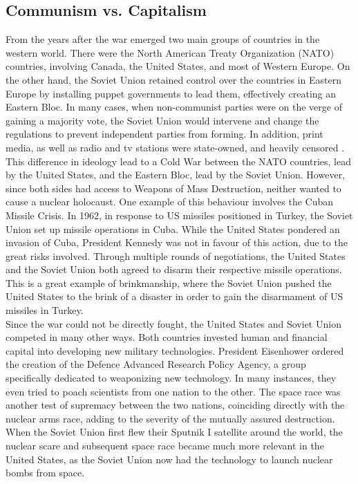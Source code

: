 \documentclass[12pt]{article}
\begin{document}
\subsection{Communism vs. Capitalism}

From the years after the war emerged two main groups of countries in the western world. There were the North American Treaty Organization (NATO) countries, involving Canada, the United States, and most of Western Europe\cite{13}. On the other hand, the Soviet Union retained control over the countries in Eastern Europe by installing puppet governments to lead them, effectively creating an Eastern Bloc\cite{13}. In many cases, when non-communist parties were on the verge of gaining a majority vote, the Soviet Union would intervene and change the regulations to prevent independent parties from forming. In addition, print media, as well as radio and tv stations were state-owned, and heavily censored \cite{14}.\\

This difference in ideology lead to a Cold War between the NATO countries, lead by the United States, and the Eastern Bloc, lead by the Soviet Union. However, since both sides had access to Weapons of Mass Destruction, neither wanted to cause a nuclear holocaust. One example of this behaviour involves the Cuban Missile Crisis. In 1962, in response to US missiles positioned in Turkey, the Soviet Union set up missile operations in Cuba\cite{15}. While the United States pondered an invasion of Cuba, President Kennedy was not in favour of this action, due to the great risks involved. Through multiple rounds of negotiations, the United States and the Soviet Union both agreed to disarm their respective missile operations\cite{15}. This is a great example of brinkmanship, where the Soviet Union pushed the United States to the brink of a disaster in order to gain the disarmament of US missiles in Turkey\cite{15}.\\

Since the war could not be directly fought, the United States and Soviet Union competed in many other ways. Both countries invested human and financial capital into developing new military technologies. President Eisenhower ordered the creation of the Defence Advanced Research Policy Agency, a group specifically dedicated to weaponizing new technology\cite{16}. In many instances, they even tried to poach scientists from one nation to the other. The space race was another test of supremacy between the two nations, coinciding directly with the nuclear arms race, adding to the severity of the mutually assured destruction. When the Soviet Union first flew their Sputnik I satellite around the world, the nuclear scare and subsequent space race became much more relevant in the United States, as the Soviet Union now had the technology to launch nuclear bombs from space\cite{17}.\\
\end{document}
